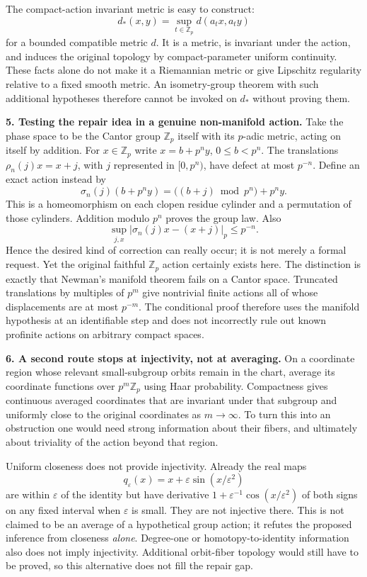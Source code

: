 \documentclass[11pt,a4paper]{article}
\newcommand{\Z}{\mathbb{Z}}
\begin{document}
The compact-action invariant metric is easy to construct:
\[
 d_*(x,y)=\sup_{t\in\Z_p}d(a_t x,a_t y)
\]
for a bounded compatible metric $d$. It is a metric, is invariant under
the action, and induces the original topology by compact-parameter
uniform continuity. These facts alone do not make it a Riemannian
metric or give Lipschitz regularity relative to a fixed smooth metric.
An isometry-group theorem with such additional hypotheses therefore
cannot be invoked on $d_*$ without proving them.

\textbf{5. Testing the repair idea in a genuine non-manifold action.}
Take the phase space to be the Cantor group $\Z_p$ itself with its
$p$-adic metric, acting on itself by addition. For $x\in\Z_p$ write
$x=b+p^n y$, $0\le b<p^n$. The translations
$\rho_n(j)x=x+j$, with $j$ represented in $[0,p^n)$, have defect at
most $p^{-n}$. Define an exact action instead by
\[
 \sigma_n(j)(b+p^n y)
 =\bigl((b+j)\bmod p^n\bigr)+p^n y.
 \tag{207.6}
\]
This is a homeomorphism on each clopen residue cylinder and a permutation
of those cylinders. Addition modulo $p^n$ proves the group law. Also
\[
 \sup_{j,x}|\sigma_n(j)x-(x+j)|_p\le p^{-n}.
\]
Hence the desired kind of correction can really occur; it is not merely
a formal request. Yet the original faithful $\Z_p$ action certainly
exists here. The distinction is exactly that Newman's manifold theorem
fails on a Cantor space. Truncated translations by multiples of $p^m$
give nontrivial finite actions all of whose displacements are at most
$p^{-m}$. The conditional proof therefore uses the manifold hypothesis
at an identifiable step and does not incorrectly rule out known
profinite actions on arbitrary compact spaces.

\textbf{6. A second route stops at injectivity, not at averaging.}
On a coordinate region whose relevant small-subgroup orbits remain in
the chart, average its coordinate functions over $p^m\Z_p$ using Haar
probability. Compactness gives continuous averaged coordinates that
are invariant under that subgroup and uniformly close to the original
coordinates as $m\to\infty$. To turn this into an obstruction one
would need strong information about their fibers, and ultimately about
triviality of the action beyond that region.

Uniform closeness does not provide injectivity. Already the real maps
\[
 q_\varepsilon(x)=x+\varepsilon\sin(x/\varepsilon^2)
\]
are within $\varepsilon$ of the identity but have derivative
$1+\varepsilon^{-1}\cos(x/\varepsilon^2)$ of both signs on any fixed
interval when $\varepsilon$ is small. They are not injective there.
This is not claimed to be an average of a hypothetical group action;
it refutes the proposed inference from closeness \emph{alone}.
Degree-one or homotopy-to-identity information also does not imply
injectivity. Additional orbit-fiber topology would still have to be
proved, so this alternative does not fill the repair gap.
\end{document}
